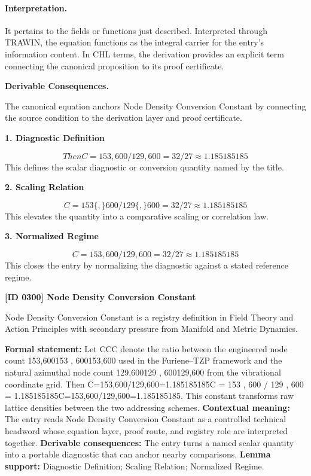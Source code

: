 \paragraph{Interpretation.}
It pertains to the fields or functions just described. Interpreted through TRAWIN, the equation functions as the integral carrier for the entry’s information content. In CHL terms, the derivation provides an explicit term connecting the canonical proposition to its proof certificate.

\par\vspace{0.35em}
\noindent\textbf{Derivable Consequences.}\quad
\begingroup
\footnotesize
\raggedright
The canonical equation anchors Node Density Conversion Constant by connecting the source condition to the derivation layer and proof certificate.
\par\endgroup

\noindent\textbf{1. Diagnostic Definition}\par
\[
Then C=153,600/129,600=32/27\approx1.185185185
\]
\noindent This defines the scalar diagnostic or conversion quantity named by the title.\par
\noindent\textbf{2. Scaling Relation}\par
\[
C = 153\{,\}600 / 129\{,\}600 = 32/27\approx1.185185185
\]
\noindent This elevates the quantity into a comparative scaling or correlation law.\par
\noindent\textbf{3. Normalized Regime}\par
\[
C=153,600/129,600=32/27\approx1.185185185
\]
\noindent This closes the entry by normalizing the diagnostic against a stated reference regime.\par

\clearpage
\noindent\textbf{[ID 0300] Node Density Conversion Constant}\par
\vspace{0.35em}
\begingroup\small
{}
Node Density Conversion Constant is a registry definition in Field Theory and Action Principles with secondary pressure from Manifold and Metric Dynamics.

\begingroup\footnotesize\setlength{\emergencystretch}{3em}\sloppy
\textbf{Formal statement:} Let CCC denote the ratio between the engineered node count 153,600153 , 600153,600 used in the Furiene--TZP framework and the natural azimuthal node count 129,600129 , 600129,600 from the vibrational coordinate grid. Then C=153,600/129,600=1.185185185C = 153 , 600 / 129 , 600 = 1.185185185C=153,600/129,600=1.185185185. This constant transforms raw lattice densities between the two addressing schemes. \textbf{Contextual meaning:} The entry reads Node Density Conversion Constant as a controlled technical headword whose equation layer, proof route, and registry role are interpreted together. \textbf{Derivable consequences:} The entry turns a named scalar quantity into a portable diagnostic that can anchor nearby comparisons. \textbf{Lemma support:} Diagnostic Definition; Scaling Relation; Normalized Regime.\par
\endgroup

